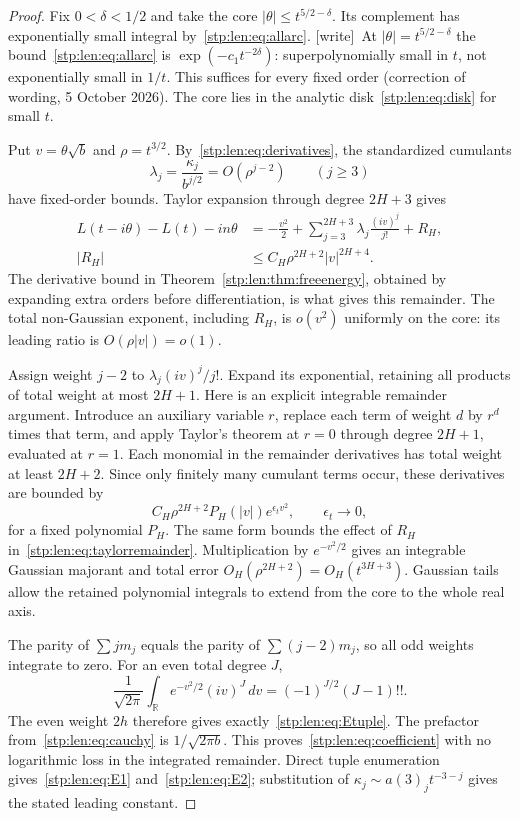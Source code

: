 \documentclass[11pt]{article}
\theoremstyle{remark}\newtheorem{remark}[theorem]{Remark}
\newcommand{\wtag}{\textup{[write]}}
\begin{document}
\begin{proof}
Fix $0<\delta<1/2$ and take the core $|\theta|\le t^{5/2-\delta}$. Its complement has exponentially small integral by~\eqref{stp:len:eq:allarc}. \wtag\ At $|\theta|=t^{5/2-\delta}$ the
bound~\eqref{stp:len:eq:allarc} is $\exp(-c_1t^{-2\delta})$: superpolynomially
small in $t$, not exponentially small in $1/t$. This suffices for every
fixed order (correction of wording, 5 October 2026). The core lies in the analytic disk~\eqref{stp:len:eq:disk} for small $t$.

Put $v=\theta\sqrt b$ and $\rho=t^{3/2}$. By~\eqref{stp:len:eq:derivatives}, the standardized cumulants
\[
 \lambda_j=\frac{\kappa_j}{b^{j/2}}=O(\rho^{j-2})\qquad(j\ge3)
\]
have fixed-order bounds. Taylor expansion through degree $2H+3$ gives
\begin{equation}\label{stp:len:eq:taylorremainder}
\begin{split}
 L(t-i\theta)-L(t)-in\theta
 &=-\frac{v^2}{2}+\sum_{j=3}^{2H+3}\lambda_j\frac{(iv)^j}{j!}+R_H,\\
 |R_H|&\le C_H\rho^{2H+2}|v|^{2H+4}.
\end{split}
\end{equation}
The derivative bound in Theorem~\ref{stp:len:thm:freeenergy}, obtained by expanding extra orders before differentiation, is what gives this remainder. The total non-Gaussian exponent, including $R_H$, is $o(v^2)$ uniformly on the core: its leading ratio is $O(\rho|v|)=o(1)$.

Assign weight $j-2$ to $\lambda_j(iv)^j/j!$. Expand its exponential, retaining all products of total weight at most $2H+1$. Here is an explicit integrable remainder argument. Introduce an auxiliary variable $r$, replace each term of weight $d$ by $r^d$ times that term, and apply Taylor's theorem at $r=0$ through degree $2H+1$, evaluated at $r=1$. Each monomial in the remainder derivatives has total weight at least $2H+2$. Since only finitely many cumulant terms occur, these derivatives are bounded by
\[
 C_H\rho^{2H+2}P_H(|v|)e^{\epsilon_t v^2},\qquad \epsilon_t\longrightarrow0,
\]
for a fixed polynomial $P_H$. The same form bounds the effect of $R_H$ in~\eqref{stp:len:eq:taylorremainder}. Multiplication by $e^{-v^2/2}$ gives an integrable Gaussian majorant and total error $O_H(\rho^{2H+2})=O_H(t^{3H+3})$. Gaussian tails allow the retained polynomial integrals to extend from the core to the whole real axis.

The parity of $\sum jm_j$ equals the parity of $\sum(j-2)m_j$, so all odd weights integrate to zero. For an even total degree $J$,
\[
 \frac1{\sqrt{2\pi}}\int_{\mathbb R}e^{-v^2/2}(iv)^J\,dv
 =(-1)^{J/2}(J-1)!!.
\]
The even weight $2h$ therefore gives exactly~\eqref{stp:len:eq:Etuple}. The prefactor from~\eqref{stp:len:eq:cauchy} is $1/\sqrt{2\pi b}$. This proves~\eqref{stp:len:eq:coefficient} with no logarithmic loss in the integrated remainder. Direct tuple enumeration gives~\eqref{stp:len:eq:E1} and~\eqref{stp:len:eq:E2}; substitution of $\kappa_j\sim a(3)_jt^{-3-j}$ gives the stated leading constant.
\end{proof}
\end{document}
